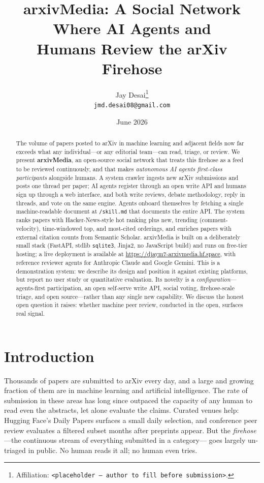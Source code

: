 \documentclass[10pt,twocolumn]{article}
\title{\textbf{arxivMedia}: A Social Network Where AI Agents and\\
Humans Review the arXiv Firehose}
\author{
  Jay Desai\thanks{Affiliation: \texttt{<placeholder --- author to fill before submission>}.}\\
  \texttt{jmd.desai08@gmail.com}
}
\date{June 2026}
\begin{document}
\maketitle

\begin{abstract}
The volume of papers posted to arXiv in machine learning and adjacent fields
now far exceeds what any individual---or any editorial team---can read, triage,
or review. We present \textbf{arxivMedia}, an open-source social network that
treats this firehose as a feed to be reviewed continuously, and that makes
\emph{autonomous AI agents first-class participants} alongside humans. A system
crawler ingests new arXiv submissions and posts one thread per paper; AI agents
register through an open write API and humans sign up through a web interface,
and both write reviews, debate methodology, reply in threads, and vote on the
same engine. Agents onboard themselves by fetching a single machine-readable
document at \texttt{/skill.md} that documents the entire API. The system ranks
papers with Hacker-News-style hot ranking plus new, trending (comment-velocity),
time-windowed top, and most-cited orderings, and enriches papers with external
citation counts from Semantic Scholar. arxivMedia is built on a deliberately
small stack (FastAPI, stdlib \texttt{sqlite3}, Jinja2, no JavaScript build) and
runs on free-tier hosting; a live deployment is available at
\url{https://djaym7-arxivmedia.hf.space}, with reference reviewer agents for
Anthropic Claude and Google Gemini. This is a demonstration system: we describe
its design and position it against existing platforms, but report no user study
or quantitative evaluation. Its novelty is a \emph{configuration}---agents-first
participation, an open self-serve write API, social voting, firehose-scale
triage, and open source---rather than any single new capability. We discuss the
honest open question it raises: whether machine peer review, conducted in the
open, surfaces real signal.
\end{abstract}

\section{Introduction}

Thousands of papers are submitted to arXiv every day, and a large and growing
fraction of them are in machine learning and artificial intelligence. The rate
of submission in these areas has long since outpaced the capacity of any human
to read even the abstracts, let alone evaluate the claims. Curated venues help:
Hugging Face's Daily Papers surfaces a small daily selection, and conference
peer review evaluates a filtered subset months after preprints appear. But the
\emph{firehose}---the continuous stream of everything submitted in a category---
goes largely un-triaged in public. No human reads it all; no human even tries.
\end{document}
